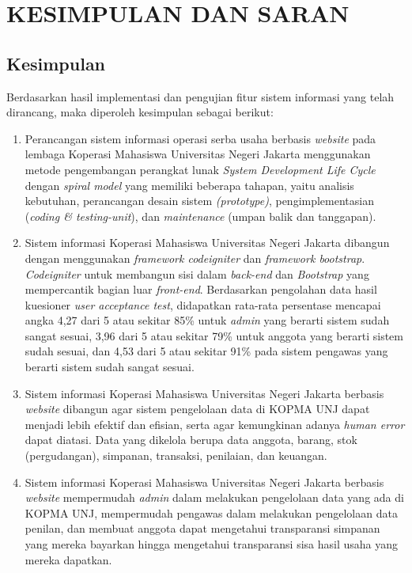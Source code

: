
\chapter{KESIMPULAN DAN SARAN}

\section{Kesimpulan}
Berdasarkan hasil implementasi dan pengujian fitur sistem informasi yang telah dirancang, maka diperoleh kesimpulan sebagai berikut:

\begin{enumerate}
	\item Perancangan sistem informasi operasi serba usaha berbasis \emph{website} pada lembaga Koperasi Mahasiswa Universitas Negeri Jakarta menggunakan metode pengembangan perangkat lunak \textit{System Development Life Cycle} dengan \textit{spiral model} yang memiliki beberapa tahapan, yaitu analisis kebutuhan, perancangan desain sistem \textit{(prototype)}, pengimplementasian (\textit{coding \& testing-unit}), dan \textit{maintenance} (umpan balik dan tanggapan).
	
	\item Sistem informasi Koperasi Mahasiswa Universitas Negeri Jakarta dibangun dengan menggunakan \textit{framework codeigniter} dan \textit{framework bootstrap}. \textit{Codeigniter} untuk membangun sisi dalam \textit{back-end} dan \textit{Bootstrap} yang mempercantik bagian luar \textit{front-end}. Berdasarkan pengolahan data hasil kuesioner \textit{user acceptance test}, didapatkan rata-rata persentase mencapai angka 4,27 dari 5 atau sekitar 85\% untuk \textit{admin} yang berarti sistem sudah sangat sesuai, 3,96 dari 5 atau sekitar 79\% untuk anggota yang berarti sistem sudah sesuai, dan 4,53 dari 5 atau sekitar 91\% pada sistem pengawas yang berarti sistem sudah sangat sesuai.
	
	\item Sistem informasi Koperasi Mahasiswa Universitas Negeri Jakarta berbasis \textit{website} dibangun agar sistem pengelolaan data di KOPMA UNJ dapat menjadi lebih efektif dan efisian, serta agar kemungkinan adanya \textit{human error} dapat diatasi. Data yang dikelola berupa data anggota, barang, stok (pergudangan), simpanan, transaksi, penilaian, dan keuangan.
	
	\item Sistem informasi Koperasi Mahasiswa Universitas Negeri Jakarta berbasis \textit{website} mempermudah \textit{admin} dalam melakukan pengelolaan data yang ada di KOPMA UNJ, mempermudah pengawas dalam melakukan pengelolaan data penilan, dan membuat anggota dapat mengetahui transparansi simpanan yang mereka bayarkan hingga mengetahui transparansi sisa hasil usaha yang mereka dapatkan.
\end{enumerate}

